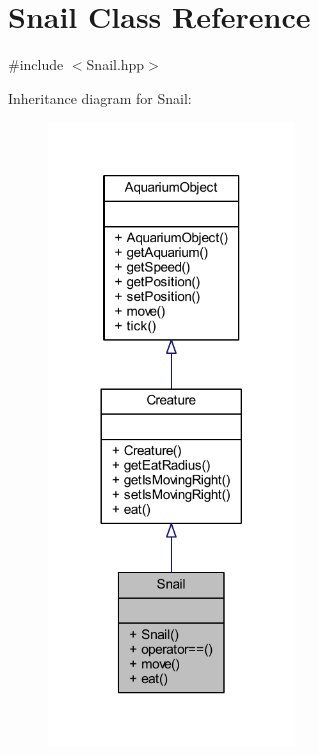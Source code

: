 \hypertarget{class_snail}{}\section{Snail Class Reference}
\label{class_snail}


{\ttfamily \#include $<$Snail.\+hpp$>$}



Inheritance diagram for Snail\+:
\nopagebreak
\begin{figure}[H]
\begin{center}
\leavevmode
\includegraphics[width=185pt]{class_snail__inherit__graph}
\end{center}
\end{figure}


